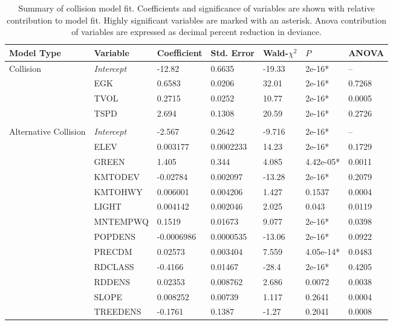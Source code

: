 \begin{table}[htp]
\caption[Summary of collision and alternative collision models]{Summary of collision model fit. Coefficients and significance of variables are shown with relative contribution to model fit. Highly significant variables are marked with an asterisk. Anova contribution of variables are expressed as decimal percent reduction in deviance.}
\begin{tabularx}{\textwidth}{lllllll} \toprule
Model Type &Variable         &Coefficient &Std. Error			&Wald-{\large$\chi$}$^2$ &{\normalsize$P$} &ANOVA\\ \midrule 
Collision  				&\emph{Intercept}	& -12.82			& 0.6635   	& -19.33	&\TL 2e-16*	& -- \\
           				& EGK				& 0.6583			& 0.0206   	& 32.01		&\TL 2e-16*	& 0.7268 \\
           				& TVOL				& 0.2715			& 0.0252   	& 10.77		&\TL 2e-16*	& 0.0005 \\
           				& TSPD				& 2.694				& 0.1308   	& 20.59		&\TL 2e-16*	& 0.2726 \\
           				&                  	&                 	&         	&         	&       	& \\
Alternative Collision	& \emph{Intercept} 	& -2.567 			& 0.2642	& -9.716 	&\TL 2e-16*	& -- \\ 
   						& ELEV				& 0.003177			& 0.0002233	& 14.23 	&\TL 2e-16*	& 0.1729 \\ 
   						& GREEN				& 1.405				& 0.344 	& 4.085		& 4.42e-05*	& 0.0011 \\ 
   						& KMTODEV			& -0.02784			& 0.002097 	& -13.28 	&\TL 2e-16*	& 0.2079 \\ 
   						& KMTOHWY			& 0.006001			& 0.004206 	& 1.427 	& 0.1537 	& 0.0004 \\ 
   						& LIGHT				& 0.004142			& 0.002046 	& 2.025 	& 0.043 	& 0.0119 \\ 
   						& MNTEMPWQ			& 0.1519			& 0.01673 	& 9.077 	&\TL 2e-16*	& 0.0398 \\ 
   						& POPDENS			& -0.0006986		& 0.0000535	& -13.06 	&\TL 2e-16*	& 0.0922 \\ 
   						& PRECDM			& 0.02573			& 0.003404 	& 7.559 	& 4.05e-14*	& 0.0483 \\ 
   						& RDCLASS			& -0.4166			& 0.01467 	& -28.4 	&\TL 2e-16*	& 0.4205 \\ 
   						& RDDENS			& 0.02353			& 0.008762 	& 2.686 	& 0.0072 	& 0.0038 \\ 
   						& SLOPE				& 0.008252			& 0.00739 	& 1.117 	& 0.2641	& 0.0004 \\ 
   						& TREEDENS			& -0.1761			& 0.1387 	& -1.27 	& 0.2041	& 0.0008 \\ 
\bottomrule
\end{tabularx}
\label{egk_sum_coll}
\end{table}

